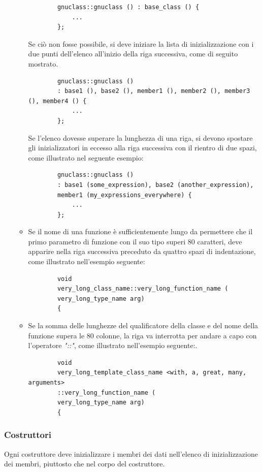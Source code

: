 \documentclass[../NomeDocumento.tex]{subfiles}
\begin{document}
\begin{itemize}
\begin{itemize}
		\begin{verbatim}
		gnuclass::gnuclass () : base_class () { 
			...
		};
		\end{verbatim}
		
		Se ciò non fosse possibile, si deve iniziare la lista di inizializzazione con i due punti dell'elenco all'inizio della riga successiva, come di seguito mostrato.
		
		\begin{verbatim}
		gnuclass::gnuclass ()
		: base1 (), base2 (), member1 (), member2 (), member3 (), member4 () { 
			...
		};
		\end{verbatim}
		
		Se l'elenco dovesse superare la lunghezza di una riga, si devono spostare gli inizializzatori in eccesso alla riga successiva con il rientro di due spazi, come illustrato nel seguente esempio:
		
		\begin{verbatim}
		gnuclass::gnuclass ()
		: base1 (some_expression), base2 (another_expression),
		member1 (my_expressions_everywhere) { 
			...
		};
		\end{verbatim}
		
		\item Se il nome di una funzione è sufficientemente lungo da permettere che il primo parametro di funzione con il suo tipo superi 80 caratteri, deve apparire nella riga successiva preceduto da quattro spazi di indentazione, come illustrato nell'esempio seguente:
		
		\begin{verbatim}
		void
		very_long_class_name::very_long_function_name (
		very_long_type_name arg)
		{
		\end{verbatim}
		
		\item Se la somma delle lunghezze del qualificatore della classe e del nome della funzione supera le 80 colonne, la riga va interrotta per andare a capo con l'operatore \textit{"::"}, come illustrato nell'esempio seguente:.
		
		\begin{verbatim}
		void
		very_long_template_class_name <with, a, great, many, arguments>
		::very_long_function_name (
		very_long_type_name arg)
		{
		\end{verbatim}		
	\end{itemize}
	
	\end{itemize}
	
	\subsubsection{Costruttori} 
	Ogni costruttore deve inizializzare i membri dei dati nell'elenco di inizializzazione dei membri, piuttosto che nel corpo del costruttore.
		
\end{document}
